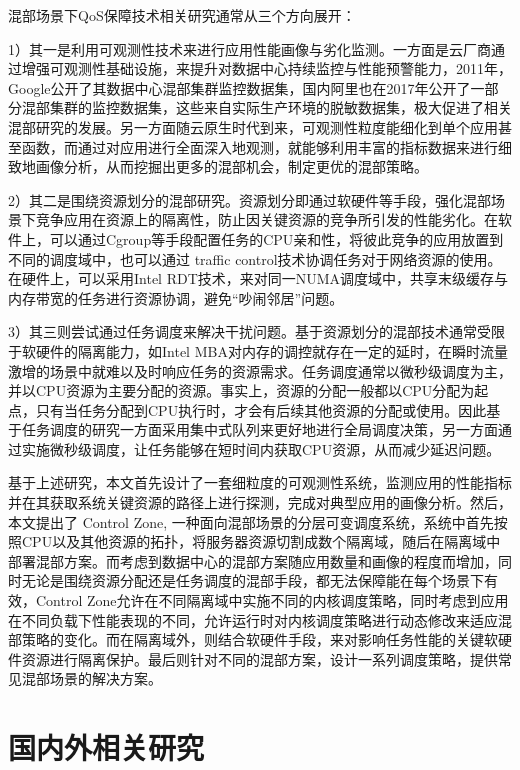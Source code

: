 混部场景下QoS保障技术相关研究通常从三个方向展开：

1）其一是利用可观测性技术来进行应用性能画像与劣化监测。一方面是云厂商通过增强可观测性基础设施，来提升对数据中心持续监控与性能预警能力，2011年，Google公开了其数据中心混部集群监控数据集，国内阿里也在2017年公开了一部分混部集群的监控数据集\citep{guo2019limits}，这些来自实际生产环境的脱敏数据集，极大促进了相关混部研究的发展。另一方面随云原生时代到来，可观测性粒度能细化到单个应用甚至函数，而通过对应用进行全面深入地观测，就能够利用丰富的指标数据来进行细致地画像分析，从而挖掘出更多的混部机会，制定更优的混部策略。

2）其二是围绕资源划分的混部研究。资源划分即通过软硬件等手段，强化混部场景下竞争应用在资源上的隔离性，防止因关键资源的竞争所引发的性能劣化。在软件上，可以通过Cgroup等手段配置任务的CPU亲和性，将彼此竞争的应用放置到不同的调度域中，也可以通过 traffic control技术\citep{hubert2002linux}协调任务对于网络资源的使用。在硬件上，可以采用Intel RDT技术\citep{guide2011intel}，来对同一NUMA调度域中，共享末级缓存与内存带宽的任务进行资源协调，避免“吵闹邻居”问题\citep{xu2018dcat, maricq2018taming, rzadca2020autopilot, kwon2020dc}。

3）其三则尝试通过任务调度来解决干扰问题。基于资源划分的混部技术通常受限于软硬件的隔离能力，如Intel MBA对内存的调控就存在一定的延时\citep{herdrich2016cache}，在瞬时流量激增的场景中就难以及时响应任务的资源需求。任务调度通常以微秒级调度为主，并以CPU资源为主要分配的资源。事实上，资源的分配一般都以CPU分配为起点，只有当任务分配到CPU执行时，才会有后续其他资源的分配或使用。因此基于任务调度的研究一方面采用集中式队列来更好地进行全局调度决策，另一方面通过实施微秒级调度，让任务能够在短时间内获取CPU资源，从而减少延迟问题。

基于上述研究，本文首先设计了一套细粒度的可观测性系统，监测应用的性能指标并在其获取系统关键资源的路径上进行探测，完成对典型应用的画像分析。然后，本文提出了 Control Zone, 一种面向混部场景的分层可变调度系统，系统中首先按照CPU以及其他资源的拓扑，将服务器资源切割成数个隔离域，随后在隔离域中部署混部方案。而考虑到数据中心的混部方案随应用数量和画像的程度而增加，同时无论是围绕资源分配还是任务调度的混部手段，都无法保障能在每个场景下有效，Control Zone允许在不同隔离域中实施不同的内核调度策略，同时考虑到应用在不同负载下性能表现的不同，允许运行时对内核调度策略进行动态修改来适应混部策略的变化。而在隔离域外，则结合软硬件手段，来对影响任务性能的关键软硬件资源进行隔离保护。最后则针对不同的混部方案，设计一系列调度策略，提供常见混部场景的解决方案。

\section{国内外相关研究}


